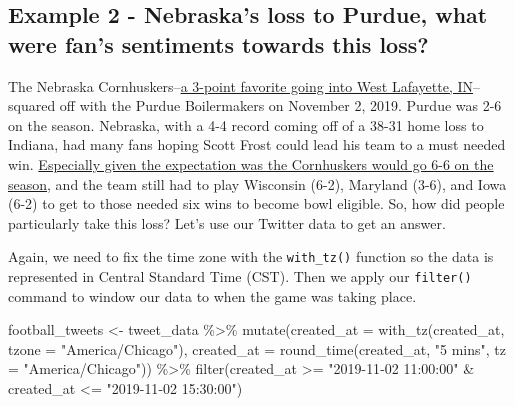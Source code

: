 \documentclass[
]{book}
\newenvironment{Shaded}{\begin{snugshade}}{\end{snugshade}}
\newcommand{\AttributeTok}[1]{\textcolor[rgb]{0.77,0.63,0.00}{#1}}
\newcommand{\FunctionTok}[1]{\textcolor[rgb]{0.00,0.00,0.00}{#1}}
\newcommand{\NormalTok}[1]{#1}
\newcommand{\OtherTok}[1]{\textcolor[rgb]{0.56,0.35,0.01}{#1}}
\newcommand{\SpecialCharTok}[1]{\textcolor[rgb]{0.00,0.00,0.00}{#1}}
\newcommand{\StringTok}[1]{\textcolor[rgb]{0.31,0.60,0.02}{#1}}
\begin{document}
\hypertarget{example-2---nebraskas-loss-to-purdue-what-were-fans-sentiments-towards-this-loss}{%
\subsection{Example 2 - Nebraska's loss to Purdue, what were fan's sentiments towards this loss?}\label{example-2---nebraskas-loss-to-purdue-what-were-fans-sentiments-towards-this-loss}}

The Nebraska Cornhuskers--\href{https://nebraska.rivals.com/news/nebraska-at-purdue-keys-to-victory-hol-score-predictions}{a 3-point favorite going into West Lafayette, IN}--squared off with the Purdue Boilermakers on November 2, 2019. Purdue was 2-6 on the season. Nebraska, with a 4-4 record coming off of a 38-31 home loss to Indiana, had many fans hoping Scott Frost could lead his team to a must needed win. \href{https://journalstar.com/sports/huskers/sipple/steven-m-sipple-frost-s-reaction-to-moos-six-win/article_bcebc067-865e-59a7-948d-c99290201294.html}{Especially given the expectation was the Cornhuskers would go 6-6 on the season}, and the team still had to play Wisconsin (6-2), Maryland (3-6), and Iowa (6-2) to get to those needed six wins to become bowl eligible. So, how did people particularly take this loss? Let's use our Twitter data to get an answer.

Again, we need to fix the time zone with the \texttt{with\_tz()} function so the data is represented in Central Standard Time (CST). Then we apply our \texttt{filter()} command to window our data to when the game was taking place.

\begin{Shaded}
\begin{Highlighting}[]
\NormalTok{football\_tweets }\OtherTok{\textless{}{-}}\NormalTok{ tweet\_data }\SpecialCharTok{\%\textgreater{}\%}
  \FunctionTok{mutate}\NormalTok{(}\AttributeTok{created\_at =} \FunctionTok{with\_tz}\NormalTok{(created\_at, }\AttributeTok{tzone =} \StringTok{"America/Chicago"}\NormalTok{),}
         \AttributeTok{created\_at =} \FunctionTok{round\_time}\NormalTok{(created\_at, }\StringTok{"5 mins"}\NormalTok{, }\AttributeTok{tz =} \StringTok{"America/Chicago"}\NormalTok{)) }\SpecialCharTok{\%\textgreater{}\%} 
  \FunctionTok{filter}\NormalTok{(created\_at }\SpecialCharTok{\textgreater{}=} \StringTok{"2019{-}11{-}02 11:00:00"} \SpecialCharTok{\&}\NormalTok{ created\_at }\SpecialCharTok{\textless{}=} \StringTok{"2019{-}11{-}02 15:30:00"}\NormalTok{) }
\end{Highlighting}
\end{Shaded}
\end{document}
